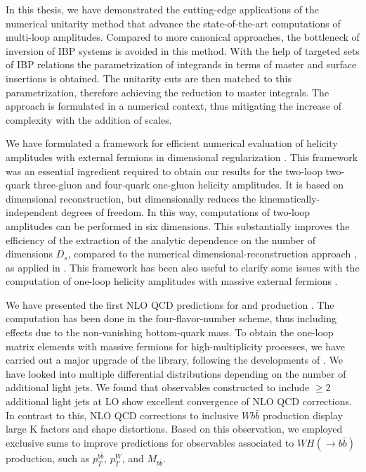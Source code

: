 In this thesis, we have demonstrated the cutting-edge applications of the numerical unitarity method \cite{Abreu:2017hqn,Abreu:2017idw,Abreu:2017xsl,Ita:2015tya,Ellis:2008ir,Ellis:2007br,Giele:2008ve}
that advance the state-of-the-art computations of multi-loop amplitudes.
Compared to more canonical approaches, the bottleneck of inversion of IBP systems is avoided in this method.
With the help of targeted sets of IBP relations 
the parametrization of integrands in terms of master and surface insertions is obtained.
The unitarity cuts are then matched to this parametrization, therefore achieving the reduction to master integrals.
The approach is formulated in a numerical context, thus mitigating the increase of complexity with the addition of scales.

We have formulated a framework for efficient numerical evaluation of helicity amplitudes with external fermions in dimensional regularization \cite{Abreu:2019odu,Abreu:2018jgq,Anger:2018ove}.
This framework was an essential ingredient required to obtain our results for the two-loop 
two-quark three-gluon and four-quark one-gluon helicity amplitudes.
It is based on dimensional reconstruction, but dimensionally
reduces the kinematically-independent degrees of freedom.
In this way, computations of two-loop amplitudes can be performed in six dimensions.
This substantially improves the efficiency of the extraction of the analytic dependence on the
number of dimensions $D_s$, compared to the numerical dimensional-reconstruction approach \cite{Giele:2008ve,Ellis:2008ir, Boughezal:2011br}, as applied
in \cite{Abreu:2017xsl,Abreu:2017hqn,Badger:2018gip,Abreu:2018jgq}.
This framework has been also useful to clarify some issues with the computation of one-loop helicity amplitudes
with massive external fermions \cite{Anger:2018ove}.

We have presented the first NLO QCD predictions for \Wbbjj{} and \Wbbjjj{} production \cite{Anger:2017glm}.
The computation has been done in the four-flavor-number scheme, thus including effects due to the non-vanishing bottom-quark mass.
To obtain the one-loop matrix elements with massive fermions for high-multiplicity processes,
we have carried out a major upgrade of the \BlackHat{} library, following the developments of \cite{Ellis:2008ir}.
We have looked into multiple differential distributions depending on the number of additional light jets.
We found that observables constructed to include $\geq2$ additional light jets at LO
show excellent convergence of NLO QCD corrections.
In contrast to this, NLO QCD corrections to inclusive $Wb\bar{b}$ production display large K factors and shape distortions.
Based on this observation, we employed exclusive sums to improve predictions for observables associated to $WH(\rightarrow b{\bar b})$
production, such as $p_T^{b\bar b}$, $p_T^W$, and $M_{b\bar b}$.

